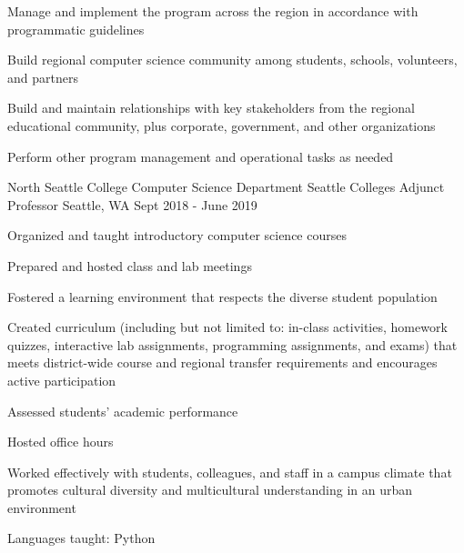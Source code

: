 \begin{cventries}
{\begin{cvitems}
\begin{cvitems}
		\item Manage and implement the program across the region in accordance with programmatic guidelines
		\item Build regional computer science community among students, schools, volunteers, and partners
		\item Build and maintain relationships with key stakeholders from the regional educational community, plus corporate, government, and other organizations
		\item Perform other program management and operational tasks as needed
	\end{cvitems}
      \end{cvitems}
    }

  \cventry
{North Seattle College Computer Science Department \newline Seattle Colleges}
    {Adjunct Professor}
    {Seattle, WA}
    {Sept 2018 - June 2019}
    {
      \begin{cvitems}
	\item {Organized and taught introductory computer science courses}\\
	\begin{cvitems}
         \item Prepared and hosted class and lab meetings
                  \item Fostered a learning environment that respects the diverse student population
                  \item Created curriculum (including but not limited to: in-class activities, homework quizzes, interactive lab assignments, programming assignments, and exams) that meets district-wide course and regional transfer requirements and encourages active participation
		\item Assessed students' academic performance
		\item Hosted office hours
	\end{cvitems}
	\vspace{2mm}
	\item Worked effectively with students, colleagues, and staff in a campus climate that promotes cultural diversity and multicultural understanding in an urban environment
	\item Languages taught: Python
      \end{cvitems}
    }


\end{cventries}
